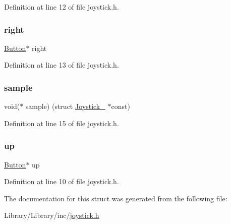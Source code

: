 Definition at line 12 of file joystick.\+h.

\mbox{\label{struct_joystick___aa9275d605c1c2da3651589e1d55f9a1a}} 
\subsubsection{\texorpdfstring{right}{right}}
{\footnotesize\ttfamily \mbox{\hyperlink{button_8h_ab369ab7fa0b9a8dfec4fc1f653ac6de5}{Button}}$\ast$ right}



Definition at line 13 of file joystick.\+h.

\mbox{\label{struct_joystick___ad68253aed96c4f9e100a9fe238eea009}} 
\subsubsection{\texorpdfstring{sample}{sample}}
{\footnotesize\ttfamily void($\ast$ sample) (struct \mbox{\hyperlink{struct_joystick__}{Joystick\+\_\+}} $\ast$const)}



Definition at line 15 of file joystick.\+h.

\mbox{\label{struct_joystick___aae2bb22ae710c823853d95ae7057884e}} 
\subsubsection{\texorpdfstring{up}{up}}
{\footnotesize\ttfamily \mbox{\hyperlink{button_8h_ab369ab7fa0b9a8dfec4fc1f653ac6de5}{Button}}$\ast$ up}



Definition at line 10 of file joystick.\+h.



The documentation for this struct was generated from the following file\+:\begin{DoxyCompactItemize}
\item 
Library/\+Library/inc/\mbox{\hyperlink{joystick_8h}{joystick.\+h}}\end{DoxyCompactItemize}
